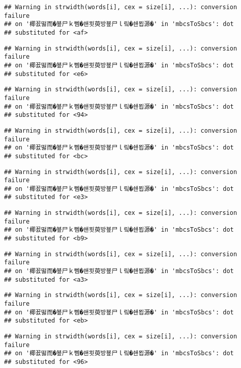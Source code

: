 \documentclass[]{article}
\begin{document}
\begin{verbatim}
## Warning in strwidth(words[i], cex = size[i], ...): conversion failure
## on '椰꾨떯而�뵾尸ｋ뻼�쇈묏萸방뵾尸ｌ맄�쇈묍源�' in 'mbcsToSbcs': dot
## substituted for <af>
\end{verbatim}

\begin{verbatim}
## Warning in strwidth(words[i], cex = size[i], ...): conversion failure
## on '椰꾨떯而�뵾尸ｋ뻼�쇈묏萸방뵾尸ｌ맄�쇈묍源�' in 'mbcsToSbcs': dot
## substituted for <e6>
\end{verbatim}

\begin{verbatim}
## Warning in strwidth(words[i], cex = size[i], ...): conversion failure
## on '椰꾨떯而�뵾尸ｋ뻼�쇈묏萸방뵾尸ｌ맄�쇈묍源�' in 'mbcsToSbcs': dot
## substituted for <94>
\end{verbatim}

\begin{verbatim}
## Warning in strwidth(words[i], cex = size[i], ...): conversion failure
## on '椰꾨떯而�뵾尸ｋ뻼�쇈묏萸방뵾尸ｌ맄�쇈묍源�' in 'mbcsToSbcs': dot
## substituted for <bc>
\end{verbatim}

\begin{verbatim}
## Warning in strwidth(words[i], cex = size[i], ...): conversion failure
## on '椰꾨떯而�뵾尸ｋ뻼�쇈묏萸방뵾尸ｌ맄�쇈묍源�' in 'mbcsToSbcs': dot
## substituted for <e3>
\end{verbatim}

\begin{verbatim}
## Warning in strwidth(words[i], cex = size[i], ...): conversion failure
## on '椰꾨떯而�뵾尸ｋ뻼�쇈묏萸방뵾尸ｌ맄�쇈묍源�' in 'mbcsToSbcs': dot
## substituted for <b9>
\end{verbatim}

\begin{verbatim}
## Warning in strwidth(words[i], cex = size[i], ...): conversion failure
## on '椰꾨떯而�뵾尸ｋ뻼�쇈묏萸방뵾尸ｌ맄�쇈묍源�' in 'mbcsToSbcs': dot
## substituted for <a3>
\end{verbatim}

\begin{verbatim}
## Warning in strwidth(words[i], cex = size[i], ...): conversion failure
## on '椰꾨떯而�뵾尸ｋ뻼�쇈묏萸방뵾尸ｌ맄�쇈묍源�' in 'mbcsToSbcs': dot
## substituted for <eb>
\end{verbatim}

\begin{verbatim}
## Warning in strwidth(words[i], cex = size[i], ...): conversion failure
## on '椰꾨떯而�뵾尸ｋ뻼�쇈묏萸방뵾尸ｌ맄�쇈묍源�' in 'mbcsToSbcs': dot
## substituted for <96>
\end{verbatim}
\end{document}

